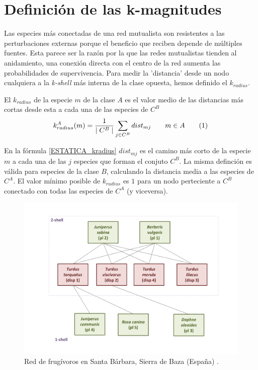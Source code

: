 \section{Definición de las k-magnitudes}

Las especies más conectadas de una red mutualista son resistentes a las perturbaciones externas porque el beneficio que reciben depende de múltiples fuentes. Esta parece ser la razón por la que las redes mutualistas tienden al anidamiento, una conexión directa con el centro de la red aumenta las probabilidades de supervivencia. Para medir la 'distancia' desde un nodo cualquiera a la \textit{k-shell} más interna de la clase opuesta, hemos definido el \textit{$k_{radius}$}.

\begin{theo} 
El \textit{$k_{radius}$} de la especie $m$ de la clase $A$ es el valor medio de las distancias más cortas desde esta a cada una de las especies de $C^B$
\begin{align*}
\displaystyle
k^A_{radius}(m) = \frac{1}{\mid C^{B} \mid}\sum\limits_{j \in C^{B}} dist_{mj}  \qquad   m \in A
\stepcounter{equation}\tag{\theequation}\label{kradius}
\end{align*}
\label{ESTATICA_kradius}
\end{theo}

En la fórmula \ref{ESTATICA_kradius} $dist_{mj}$ es el camino más corto de la especie $m$ a cada una de las $j$ especies que forman el conjuto $C^B$. La misma definción es válida para especies de la clase $B$, calculando la distancia media a las especies de $C^A$. El valor mínimo posible de $k_{radius}$ es $1$ para un nodo perteciente a $C^B$ conectado con todas las especies de $C^A$ (y viceversa).


\begin{figure}[h!]
\centering
\includegraphics[scale=0.5]{Figures/ESTATICA_SD_030_example_network.pdf}
\caption {Red de frugívoros en Santa Bárbara, Sierra de Baza (España) \cite{jordano1993geographical}.}
\label{fig:ESTATICA_red_example}
\end{figure}

